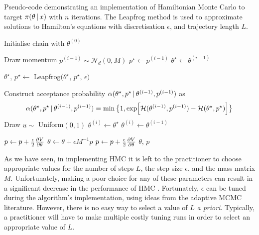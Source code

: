 \begin{algorithm}[tb]
  \caption{Pseudo-code demonstrating an implementation of Hamiltonian Monte
    Carlo to target $\pi(\theta \,|\, x)$ with $n$ iterations. The Leapfrog
    method is used to approximate solutions to Hamilton's equations with
    discretisation $\epsilon$, and trajectory length $L$.}
  \label{alg:hmc}
  \begin{algorithmic}[1]

    \State Initialise chain with $\theta^{(0)}$


      \State Draw momentum $p^{(i-1)} \sim \mathcal{N}_d(0, M)$
      \State $p^\star \leftarrow p^{(i-1)}$
      \State $\theta^\star \leftarrow\theta^{(i-1)}$

      \State {}
        \State $\theta^\star$, $p^\star \leftarrow$
          Leapfrog$(\theta^\star$, $p^\star$, $\epsilon)$
      \EndFor

      \State Construct acceptance probability
        $\alpha(\theta^\star, p^\star \,|\,
                \theta^{(i-1)}, p^{(i-1)})$ as
        \begin{equation*}
          \alpha(\theta^\star, p^\star \,|\,\theta^{(i-1)}, p^{(i-1)}) =
          \min\big\{1,
            \exp[\mathcal{H}(\theta^{(i-1)}, p^{(i-1)}) -
                 \mathcal{H}(\theta^\star, p^\star)]
            \big\}
        \end{equation*}
      \State Draw $u \sim$ Uniform$(0, 1)$
        \State {}
        \State $\theta^{(i)} \leftarrow\theta^\star$
      \Else
        \State {}
        \State $\theta^{(i)} \leftarrow\theta^{(i-1)}$
      \EndIf
    \EndFor
  \State

    \State $p \leftarrow p + \frac{\epsilon}{2} \pdv{V}{\theta}$
    \State $\theta \leftarrow \theta + \epsilon M^{-1} p$
    \State $p \leftarrow p + \frac{\epsilon}{2} \pdv{V}{\theta}$
    \State \Return $\theta$, $p$
  \EndProcedure

  \end{algorithmic}
\end{algorithm}

As we have seen, in implementing HMC it is left to the practitioner to choose
appropriate values for the number of steps $L$, the step size $\epsilon$, and
the mass matrix $M$. Unfortunately, making a poor choice for any of these
parameters can result in a significant decrease in the performance of HMC
\parencite{hoffman14}. Fortunately, $\epsilon$ can be tuned during the
algorithm's implementation, using ideas from the adaptive MCMC literature.
However, there is no easy way to select a value of $L$ \emph{a priori}.
Typically, a practitioner will have to make multiple costly tuning runs in
order to select an appropriate value of $L$.

